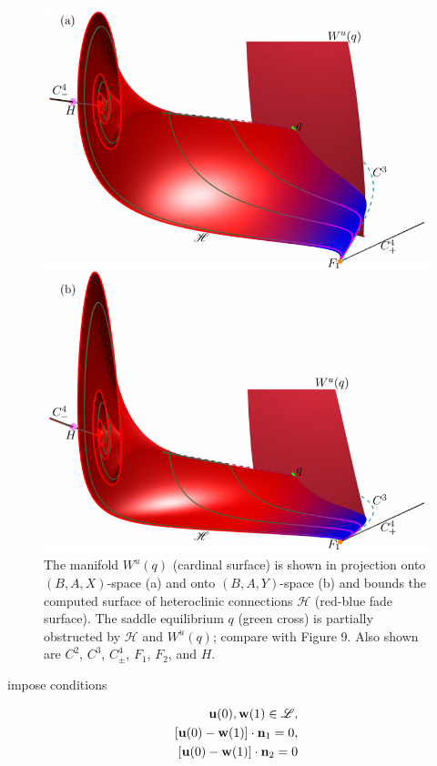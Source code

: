 \documentclass{ws-ijbc}
\begin{document}
\begin{figure}[H]
\centering
\includegraphics[]{./figures/MKMO_10.pdf}
\caption{The manifold $W^u(q)$ (cardinal surface) is shown in projection onto $(B,A,X)$-space (a) and onto $(B,A,Y)$-space (b) and bounds the computed surface of heteroclinic connections $\mathscr{H}$ (red-blue fade surface).  The saddle equilibrium $q$ (green cross) is partially obstructed by $\mathscr{H}$ and $W^{u}(q)$; compare with Figure 9.   Also shown are $C^2$, $C^3$, $C^4_\pm$, $F_1$, $F_2$, and $H$.}
\label{figure_10}
\end{figure}

impose conditions

\begin{align}
	\begin{split}
		\mathbf{u}(0), \mathbf{w}(1) \in \mathscr{L},\\ \vspace{2mm}
		[\mathbf{u}(0) - \mathbf{w}(1)] \cdot \mathbf{n}_1 =0, \\ \vspace{2mm}
		[\mathbf{u}(0) - \mathbf{w}(1)] \cdot \mathbf{n}_2 =0
	\end{split}
	\label{Z}
\end{align}
\end{document}

